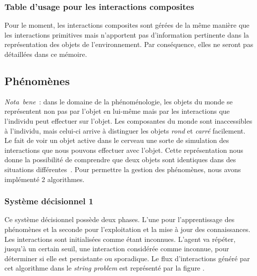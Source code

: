 \documentclass{llncs}
\begin{document}
\subsubsection{Table d'usage pour les interactions composites}
Pour le moment, les interactions composites sont gérées de la même manière que les interactions primitives mais n'apportent pas d'information pertinente dans la représentation des objets de l'environnement. Par conséquence, elles ne seront pas détaillées dans ce mémoire.

\subsection{Phénomènes}
\emph{Nota~bene}~: dans le domaine de la phénoménologie, les objets du monde se représentent non pas par l'objet en lui-même mais par les interactions que l'individu peut effectuer sur l'objet. Les composantes du monde sont inaccessibles à l'individu, mais celui-ci arrive à distinguer les objets \emph{rond} et \emph{carré} facilement. Le fait de voir un objet active dans le cerveau une sorte de simulation des interactions que nous pouvons effectuer avec l'objet. Cette représentation nous donne la possibilité de comprendre que deux objets sont identiques dans des situations différentes~\cite{singe-murata1997object}. Pour permettre la gestion des phénomènes, nous avons implémenté 2 algorithmes. 
\subsubsection{Système décisionnel \num{1}}
Ce système décisionnel possède deux phases. L'une pour l'apprentissage des phénomènes et la seconde pour l'exploitation et la mise à jour des connaissances. Les interactions sont initialisées comme étant inconnues. L'agent va répéter, jusqu'à un certain seuil, une interaction considérée comme inconnue, pour déterminer si elle est persistante ou sporadique. Le flux d'interactions généré par cet algorithme dans le \emph{string problem} est représenté par la figure . 
\end{document}
